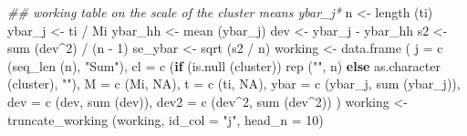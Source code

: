 \documentclass[
  letterpaper,
  DIV=11,
  numbers=noendperiod]{scrreprt}
\newenvironment{Shaded}{\begin{snugshade}}{\end{snugshade}}
\newcommand{\AttributeTok}[1]{\textcolor[rgb]{0.40,0.45,0.13}{#1}}
\newcommand{\ConstantTok}[1]{\textcolor[rgb]{0.56,0.35,0.01}{#1}}
\newcommand{\ControlFlowTok}[1]{\textcolor[rgb]{0.00,0.23,0.31}{\textbf{#1}}}
\newcommand{\DecValTok}[1]{\textcolor[rgb]{0.68,0.00,0.00}{#1}}
\newcommand{\DocumentationTok}[1]{\textcolor[rgb]{0.37,0.37,0.37}{\textit{#1}}}
\newcommand{\FunctionTok}[1]{\textcolor[rgb]{0.28,0.35,0.67}{#1}}
\newcommand{\NormalTok}[1]{\textcolor[rgb]{0.00,0.23,0.31}{#1}}
\newcommand{\OtherTok}[1]{\textcolor[rgb]{0.00,0.23,0.31}{#1}}
\newcommand{\SpecialCharTok}[1]{\textcolor[rgb]{0.37,0.37,0.37}{#1}}
\newcommand{\StringTok}[1]{\textcolor[rgb]{0.13,0.47,0.30}{#1}}
\renewcommand{\[}{\begin{equation}}
\renewcommand{\]}{\end{equation}}
\begin{document}
\begin{Shaded}
\begin{Highlighting}[]
    \DocumentationTok{\#\# working table on the scale of the cluster means ybar\_j*}
\NormalTok{    n }\OtherTok{\textless{}{-}} \FunctionTok{length}\NormalTok{ (ti)}
\NormalTok{    ybar\_j }\OtherTok{\textless{}{-}}\NormalTok{ ti }\SpecialCharTok{/}\NormalTok{ Mi}
\NormalTok{    ybar\_hh }\OtherTok{\textless{}{-}} \FunctionTok{mean}\NormalTok{ (ybar\_j)}
\NormalTok{    dev }\OtherTok{\textless{}{-}}\NormalTok{ ybar\_j }\SpecialCharTok{{-}}\NormalTok{ ybar\_hh}
\NormalTok{    s2 }\OtherTok{\textless{}{-}} \FunctionTok{sum}\NormalTok{ (dev}\SpecialCharTok{\^{}}\DecValTok{2}\NormalTok{) }\SpecialCharTok{/}\NormalTok{ (n }\SpecialCharTok{{-}} \DecValTok{1}\NormalTok{)}
\NormalTok{    se\_ybar }\OtherTok{\textless{}{-}} \FunctionTok{sqrt}\NormalTok{ (s2 }\SpecialCharTok{/}\NormalTok{ n)}
\NormalTok{    working }\OtherTok{\textless{}{-}} \FunctionTok{data.frame}\NormalTok{ (}
        \AttributeTok{j    =} \FunctionTok{c}\NormalTok{ (}\FunctionTok{seq\_len}\NormalTok{ (n), }\StringTok{"Sum"}\NormalTok{),}
        \AttributeTok{cl   =} \FunctionTok{c}\NormalTok{ (}\ControlFlowTok{if}\NormalTok{ (}\FunctionTok{is.null}\NormalTok{ (cluster)) }\FunctionTok{rep}\NormalTok{ (}\StringTok{""}\NormalTok{, n) }\ControlFlowTok{else} \FunctionTok{as.character}\NormalTok{ (cluster), }\StringTok{""}\NormalTok{),}
        \AttributeTok{M    =} \FunctionTok{c}\NormalTok{ (Mi, }\ConstantTok{NA}\NormalTok{),}
        \AttributeTok{t    =} \FunctionTok{c}\NormalTok{ (ti, }\ConstantTok{NA}\NormalTok{),}
        \AttributeTok{ybar =} \FunctionTok{c}\NormalTok{ (ybar\_j, }\FunctionTok{sum}\NormalTok{ (ybar\_j)),}
        \AttributeTok{dev  =} \FunctionTok{c}\NormalTok{ (dev, }\FunctionTok{sum}\NormalTok{ (dev)),}
        \AttributeTok{dev2 =} \FunctionTok{c}\NormalTok{ (dev}\SpecialCharTok{\^{}}\DecValTok{2}\NormalTok{, }\FunctionTok{sum}\NormalTok{ (dev}\SpecialCharTok{\^{}}\DecValTok{2}\NormalTok{))}
\NormalTok{    )}
\NormalTok{    working }\OtherTok{\textless{}{-}} \FunctionTok{truncate\_working}\NormalTok{ (working, }\AttributeTok{id\_col =} \StringTok{"j"}\NormalTok{, }\AttributeTok{head\_n =} \DecValTok{10}\NormalTok{)}


\end{Highlighting}
\end{Shaded}
\end{document}
